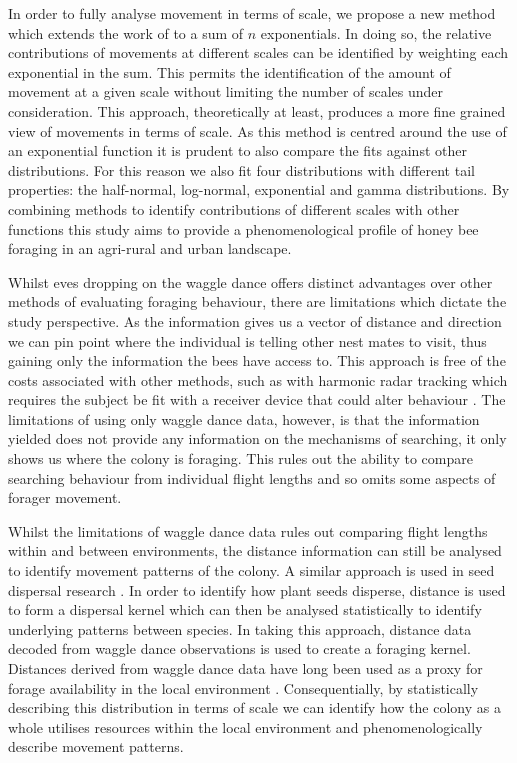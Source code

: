 \documentclass[11pt,usenames,dvipsnames]{article}
\begin{document}
In order to fully analyse movement in terms of scale, we propose a new method which extends the work of \cite{Petrovskii2011} to a sum of $n$ exponentials. In doing so, the relative contributions of movements at different scales can be identified by weighting each exponential in the sum. This permits the identification of the amount of movement at a given scale without limiting the number of scales under consideration. This approach, theoretically at least, produces a more fine grained view of movements in terms of scale. As this method is centred around the use of an exponential function it is prudent to also compare the fits against other distributions. For this reason we also fit four distributions with different tail properties: the half-normal, log-normal, exponential and gamma distributions. By combining methods to identify contributions of different scales with other functions this study aims to provide a phenomenological profile of honey bee foraging in an agri-rural and urban landscape.

Whilst eves dropping on the waggle dance offers distinct advantages over other methods of evaluating foraging behaviour, there are limitations which dictate the study perspective. As the information gives us a vector of distance and direction we can pin point where the individual is telling other nest mates to visit, thus gaining only the information the bees have access to. This approach is free of the costs associated with other methods, such as with harmonic radar tracking which requires the subject be fit with a receiver device that could alter behaviour \citep{Oneal2004}. The limitations of using only waggle dance data, however, is that the information yielded does not provide any information on the mechanisms of searching, it only shows us where the colony is foraging. This rules out the ability to compare searching behaviour from individual flight lengths and so omits some aspects of forager movement.

Whilst the limitations of waggle dance data rules out comparing flight lengths within and between environments, the distance information can still be analysed to identify movement patterns of the colony. A similar approach is used in seed dispersal research \citep{Bullock2017}. In order to identify how plant seeds disperse, distance is used to form a dispersal kernel which can then be analysed statistically to identify underlying patterns between species. In taking this approach, distance data decoded from waggle dance observations is used to create a foraging kernel. Distances derived from waggle dance data have long been used as a proxy for forage availability in the local environment \citep{Visscher1982, Waddington1994, Couvillon2014, Couvillon2015}. Consequentially, by statistically describing this distribution in terms of scale we can identify how the colony as a whole utilises resources within the local environment and phenomenologically describe movement patterns.
\end{document}
